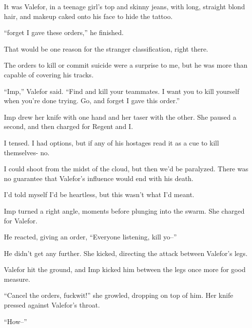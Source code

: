 It was Valefor, in a teenage girl's top and skinny jeans, with long, straight blond hair, and makeup caked onto his face to hide the tattoo.



``\ldotsand forget I gave these orders,'' he finished.



That would be one reason for the stranger classification, right there.



The orders to kill or commit suicide were a surprise to me, but he was more than capable of covering his tracks.



``Imp,'' Valefor said.  ``Find and kill your teammates.  I want you to kill yourself when you're done trying.  Go, and forget I gave this order.''



Imp drew her knife with one hand and her taser with the other.  She paused a second, and then charged for Regent and I.



I tensed.  I had options, but if any of his hostages read it as a cue to kill themselves-  no.



I could shoot from the midst of the cloud, but then we'd be paralyzed.  There was no guarantee that Valefor's influence would end with his death.



I'd told myself I'd be heartless, but this wasn't what I'd meant.



Imp turned a right angle, moments before plunging into the swarm.  She charged for Valefor.



He reacted, giving an order, ``Everyone listening, kill yo--''



He didn't get any further.  She kicked, directing the attack between Valefor's legs.



Valefor hit the ground, and Imp kicked him between the legs once more for good measure.



``Cancel the orders, fuckwit!'' she growled, dropping on top of him.  Her knife pressed against Valefor's throat.



``How--''



